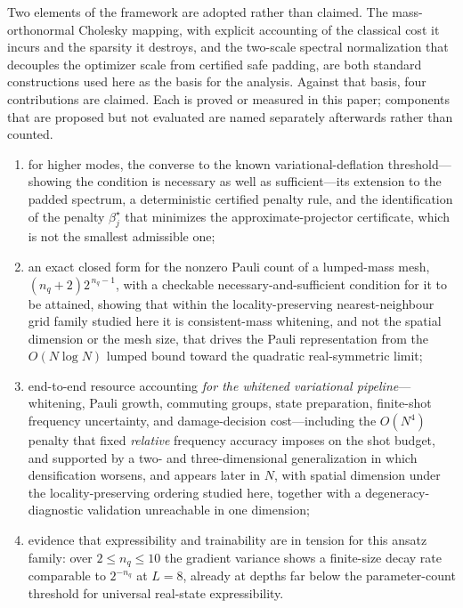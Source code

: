 \documentclass{ieeeaccess}
\begin{document}
Two elements of the framework are adopted rather than claimed. The mass-orthonormal Cholesky mapping, with explicit accounting of the classical cost it incurs and the sparsity it destroys, and the two-scale spectral normalization that decouples the optimizer scale from certified safe padding, are both standard constructions used here as the basis for the analysis. Against that basis, four contributions are claimed. Each is proved or measured in this paper; components that are proposed but not evaluated are named separately afterwards rather than counted.
\begin{enumerate}[label=(\roman*)]
\item for higher modes, the converse to the known variational-deflation threshold---showing the condition is necessary as well as sufficient---its extension to the padded spectrum, a deterministic certified penalty rule, and the identification of the penalty $\beta_j^\star$ that minimizes the approximate-projector certificate, which is not the smallest admissible one;
\item an exact closed form for the nonzero Pauli count of a lumped-mass mesh, $(n_q+2)2^{\,n_q-1}$, with a checkable necessary-and-sufficient condition for it to be attained, showing that within the locality-preserving nearest-neighbour grid family studied here it is consistent-mass whitening, and not the spatial dimension or the mesh size, that drives the Pauli representation from the $O(N\log N)$ lumped bound toward the quadratic real-symmetric limit;
\item end-to-end resource accounting \emph{for the whitened variational pipeline}---whitening, Pauli growth, commuting groups, state preparation, finite-shot frequency uncertainty, and damage-decision cost---including the $O(N^{4})$ penalty that fixed \emph{relative} frequency accuracy imposes on the shot budget, and supported by a two- and three-dimensional generalization in which densification worsens, and appears later in $N$, with spatial dimension under the locality-preserving ordering studied here, together with a degeneracy-diagnostic validation unreachable in one dimension;
\item evidence that expressibility and trainability are in tension for this ansatz family: over $2\le n_q\le10$ the gradient variance shows a finite-size decay rate comparable to $2^{-n_q}$ at $L=8$, already at depths far below the parameter-count threshold for universal real-state expressibility.
\end{enumerate}
\end{document}
